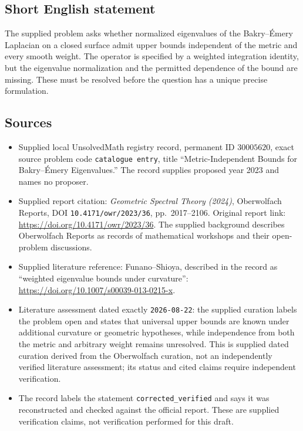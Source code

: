 \documentclass[11pt]{article}
\begin{document}
\subsection{Short English statement}
The supplied problem asks whether normalized eigenvalues of the Bakry--\'Emery Laplacian on a closed surface admit upper bounds independent of the metric and every smooth weight. The operator is specified by a weighted integration identity, but the eigenvalue normalization and the permitted dependence of the bound are missing. These must be resolved before the question has a unique precise formulation.
\subsection{Sources}
\begin{itemize}
\item Supplied local UnsolvedMath registry record, permanent ID \(30005620\), exact source problem code \texttt{catalogue entry}, title ``Metric-Independent Bounds for Bakry--\'Emery Eigenvalues.'' The record supplies proposed year 2023 and names no proposer.
\item Supplied report citation: \emph{Geometric Spectral Theory (2024)}, Oberwolfach Reports, DOI \texttt{10.4171/owr/2023/36}, pp.\ 2017--2106. Original report link: \url{https://doi.org/10.4171/owr/2023/36}. The supplied background describes Oberwolfach Reports as records of mathematical workshops and their open-problem discussions.
\item Supplied literature reference: Funano--Shioya, described in the record as ``weighted eigenvalue bounds under curvature'': \url{https://doi.org/10.1007/s00039-013-0215-x}.
\item Literature assessment dated exactly \texttt{2026-08-22}: the supplied curation labels the problem open and states that universal upper bounds are known under additional curvature or geometric hypotheses, while independence from both the metric and arbitrary weight remains unresolved. This is supplied dated curation derived from the Oberwolfach curation, not an independently verified literature assessment; its status and cited claims require independent verification.
\item The record labels the statement \texttt{corrected\_verified} and says it was reconstructed and checked against the official report. These are supplied verification claims, not verification performed for this draft.
\end{itemize}
\end{document}
